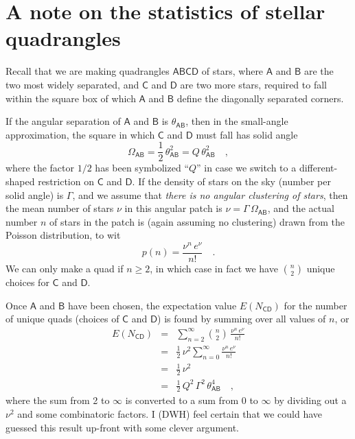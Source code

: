 \documentclass[letterpaper]{article}
\newcommand{\starlabel}[1]{\mathsf{#1}}
\newcommand{\AAA}{\starlabel{A}}
\newcommand{\BBB}{\starlabel{B}}
\newcommand{\CCC}{\starlabel{C}}
\newcommand{\DDD}{\starlabel{D}}
\newcommand{\thetaAB}{\theta_{\AAA\BBB}}
\newcommand{\OmegaAB}{\Omega_{\AAA\BBB}}
\newcommand{\ENCD}{E(N_{\CCC\DDD})}
\begin{document}
\section*{A note on the statistics of stellar quadrangles}

Recall that we are making quadrangles $\AAA\BBB\CCC\DDD$ of stars,
where $\AAA$ and $\BBB$ are the two most widely separated, and $\CCC$
and $\DDD$ are two more stars, required to fall within the square box
of which $\AAA$ and $\BBB$ define the diagonally separated corners.

If the angular separation of $\AAA$ and $\BBB$ is $\thetaAB$, then in
the small-angle approximation, the square in which $\CCC$ and $\DDD$
must fall has solid angle
\begin{equation}
\OmegaAB = \frac{1}{2}\,\thetaAB^2 = Q\,\thetaAB^2 \quad ,
\end{equation}
where the factor $1/2$ has been symbolized ``$Q$'' in case we switch
to a different-shaped restriction on $\CCC$ and $\DDD$.  If the
density of stars on the sky (number per solid angle) is $\Gamma$, and
we assume that \emph{there is no angular clustering of stars}, then
the mean number of stars $\nu$ in this angular patch is
$\nu=\Gamma\,\OmegaAB$, and the actual number $n$ of stars in the
patch is (again assuming no clustering) drawn from the Poisson
distribution, to wit
\begin{equation}
p(n) = \frac{\nu^n\,e^{\nu}}{n!} \quad .
\end{equation}
We can only make a quad if $n\geq2$, in which case in fact we have
${n\choose 2}$ unique choices for $\CCC$ and $\DDD$.

Once $\AAA$ and $\BBB$ have been chosen, the expectation value $\ENCD$
for the number of unique quads (choices of $\CCC$ and $\DDD$) is found
by summing over all values of $n$, or
\begin{eqnarray}\displaystyle
\ENCD & = & \sum_{n=2}^{\infty} {n\choose 2}\,
              \frac{\nu^n\,e^{\nu}}{n!} \\
      & = & \frac{1}{2}\,\nu^2 \sum_{n=0}^{\infty} 
              \frac{\nu^n\,e^{\nu}}{n!} \\
      & = & \frac{1}{2}\,\nu^2 \\
      & = & \frac{1}{2}\,Q^2\,\Gamma^2\,\thetaAB^4 \quad ,
\end{eqnarray}
where the sum from 2 to $\infty$ is converted to a sum from 0 to
$\infty$ by dividing out a $\nu^2$ and some combinatoric factors.  I
(DWH) feel certain that we could have guessed this result up-front
with some clever argument.
\end{document}
